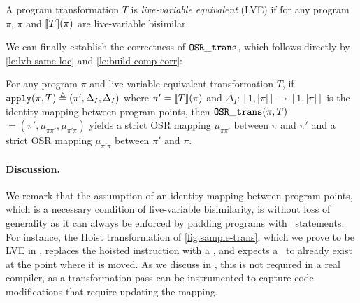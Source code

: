 \begin{definition}
\label{de:lve-trans}
A program transformation $T$ is {\em live-variable equivalent} (LVE) if for any program $\pi$, $\pi$ and $[\![T]\!](\pi)$ are live-variable bisimilar.
\end{definition}

\noindent We can finally establish the correctness of ${\tt OSR\_trans}$, which follows directly by \mylemma\ref{le:lvb-same-loc} and \mylemma\ref{le:build-comp-corr}:

\begin{theorem}
\label{th:osr-trans-correctness}
For any program $\pi$ and live-variable equivalent transformation $T$, if ${\tt apply}(\pi,T)\triangleq(\pi', \Delta_I, \Delta_I)$ where $\pi'=[\![T]\!](\pi)$ and $\Delta_I:[1,|\pi|]\rightarrow [1,|\pi|]$ is the identity mapping between program points, then ${\tt OSR\_trans}(\pi,T)$ $=(\pi',\mu_{\pi\pi'},\mu_{\pi'\pi})$ yields a strict OSR mapping $\mu_{\pi\pi'}$ between $\pi$ and $\pi'$ and a strict OSR mapping $\mu_{\pi'\pi}$ between $\pi'$ and $\pi$.
\end{theorem}

\paragraph*{Discussion.} We remark that the assumption of an identity mapping between program points, which is a necessary condition of live-variable bisimilarity, is without loss of generality as it can  always be enforced by padding programs with \wskip\ statements. For instance, the Hoist transformation of \myfigure\ref{fig:sample-trans}, which we prove to be LVE in \missing, replaces the hoisted instruction with a \wskip, and expects a \wskip\ to already exist at the point where it is moved. As we discuss in \missing, this is not required in a real compiler, as a transformation pass can be instrumented to capture code modifications that require updating the mapping.
